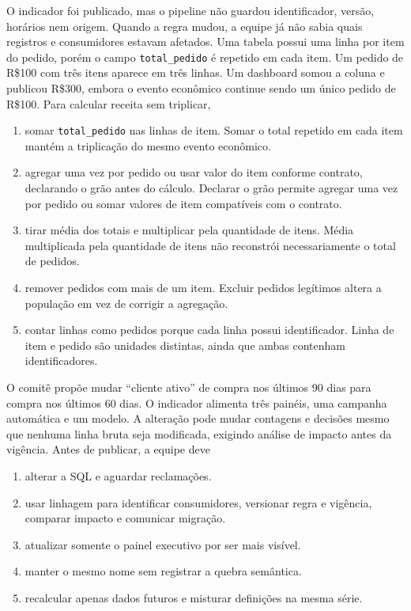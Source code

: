 \TextoBase

O indicador foi publicado, mas o pipeline não guardou identificador, versão, horários nem origem. Quando a regra mudou, a equipe já não sabia quais registros e consumidores estavam afetados.
 Uma tabela possui uma linha por item do pedido, porém o campo \texttt{total\_pedido} é repetido em cada item. Um pedido de R\$100 com três itens aparece em três linhas. Um dashboard somou a coluna e publicou R\$300, embora o evento econômico continue sendo um único pedido de R\$100.
\FonteDidatica
\Comando Para calcular receita sem triplicar,
\begin{enumerate}[label=\Alph*)]
  \item somar \texttt{total\_pedido} nas linhas de item. Somar o total repetido em cada item mantém a triplicação do mesmo evento econômico.
  \item agregar uma vez por pedido ou usar valor do item conforme contrato, declarando o grão antes do cálculo. Declarar o grão permite agregar uma vez por pedido ou somar valores de item compatíveis com o contrato.
  \item tirar média dos totais e multiplicar pela quantidade de itens. Média multiplicada pela quantidade de itens não reconstrói necessariamente o total de pedidos.
  \item remover pedidos com mais de um item. Excluir pedidos legítimos altera a população em vez de corrigir a agregação.
  \item contar linhas como pedidos porque cada linha possui identificador. Linha de item e pedido são unidades distintas, ainda que ambas contenham identificadores.
\end{enumerate}

\TextoBase O comitê propõe mudar ``cliente ativo'' de compra nos últimos 90 dias para compra nos últimos 60 dias. O indicador alimenta três painéis, uma campanha automática e um modelo. A alteração pode mudar contagens e decisões mesmo que nenhuma linha bruta seja modificada, exigindo análise de impacto antes da vigência.
\FonteDidatica
\Comando Antes de publicar, a equipe deve
\begin{enumerate}[label=\Alph*)]\item alterar a SQL e aguardar reclamações.\item usar linhagem para identificar consumidores, versionar regra e vigência, comparar impacto e comunicar migração.\item atualizar somente o painel executivo por ser mais visível.\item manter o mesmo nome sem registrar a quebra semântica.\item recalcular apenas dados futuros e misturar definições na mesma série.
\end{enumerate}


